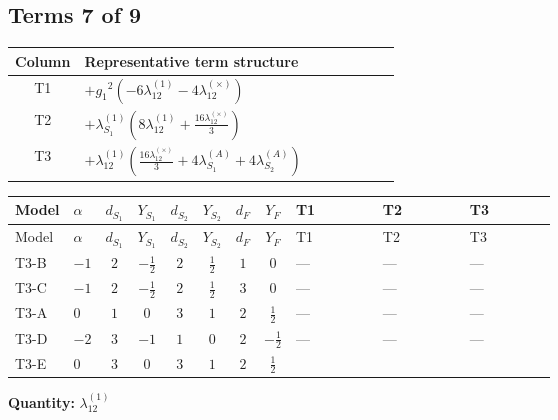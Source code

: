 \documentclass[8pt]{article}
\begin{document}
\begin{landscape}
\subsection*{Terms 7 of 9}
\begin{center}
\begin{tabular}{@{}c >{\raggedright\arraybackslash}p{0.82\linewidth}@{}}
\toprule
Column & Representative term structure \\
\midrule
T1 & \(\displaystyle +{g_1}^2 (-6 {\lambda_{12}^{(1)}}-4 {\lambda_{12}^{(\times)}})\) \\
\midrule
T2 & \(\displaystyle +{\lambda_{S_1}^{(1)}} \left(8 {\lambda_{12}^{(1)}}+\frac{16 {\lambda_{12}^{(\times)}}}{3}\right)\) \\
\midrule
T3 & \(\displaystyle +{\lambda_{12}^{(1)}} \left(\frac{16 {\lambda_{12}^{(\times)}}}{3}+4 {\lambda_{S_1}^{(A)}}+4 {\lambda_{S_2}^{(A)}}\right)\) \\
\midrule
\bottomrule
\end{tabular}
\end{center}
\smallskip
\tiny
\begin{longtable}{@{}llcccccc >{\raggedright\arraybackslash}p{0.21\linewidth} >{\raggedright\arraybackslash}p{0.21\linewidth} >{\raggedright\arraybackslash}p{0.21\linewidth}@{}}
\toprule
Model & $\alpha$ & $d_{S_1}$ & $Y_{S_1}$ & $d_{S_2}$ & $Y_{S_2}$ & $d_F$ & $Y_F$ & T1 & T2 & T3 \\
\midrule
\endfirsthead
\toprule
Model & $\alpha$ & $d_{S_1}$ & $Y_{S_1}$ & $d_{S_2}$ & $Y_{S_2}$ & $d_F$ & $Y_F$ & T1 & T2 & T3 \\
\midrule
\endhead
T3-B & $-1$ & $2$ & $-\frac{1}{2}$ & $2$ & $\frac{1}{2}$ & $1$ & $0$ & --- & --- & --- \\
\midrule
T3-C & $-1$ & $2$ & $-\frac{1}{2}$ & $2$ & $\frac{1}{2}$ & $3$ & $0$ & --- & --- & --- \\
\midrule
T3-A & $0$ & $1$ & $0$ & $3$ & $1$ & $2$ & $\frac{1}{2}$ & --- & --- & --- \\
\midrule
T3-D & $-2$ & $3$ & $-1$ & $1$ & $0$ & $2$ & $-\frac{1}{2}$ & --- & --- & --- \\
\midrule
T3-E & $0$ & $3$ & $0$ & $3$ & $1$ & $2$ & $\frac{1}{2}$ & \scriptsize\adjustbox{max width=\linewidth}{$\begin{gathered} +{g_1}^2 (-6 {\lambda_{12}^{(1)}}-4 {\lambda_{12}^{(\times)}})\end{gathered}$} & \scriptsize\adjustbox{max width=\linewidth}{$\begin{gathered} +{\lambda_{S_1}^{(1)}} \left(8 {\lambda_{12}^{(1)}}+\frac{16 {\lambda_{12}^{(\times)}}}{3}\right)\end{gathered}$} & \scriptsize\adjustbox{max width=\linewidth}{$\begin{gathered} +{\lambda_{12}^{(1)}} \left(\frac{16 {\lambda_{12}^{(\times)}}}{3}+4 {\lambda_{S_1}^{(A)}}+4 {\lambda_{S_2}^{(A)}}\right)\end{gathered}$} \\
\midrule
\bottomrule
\end{longtable}
\clearpage
\noindent\textbf{Quantity: }$\lambda_{12}^{(1)}$\par\smallskip

\end{landscape}
\end{document}

